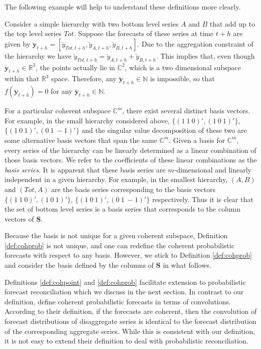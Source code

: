 \documentclass[a4paper, 11pt]{article}
\begin{document}
The following example will help to understand these definitions more clearly.

Consider a simple hierarchy with two bottom level series $A$ and $B$ that add up to the top level series $Tot$. Suppose the forecasts of these series at time $t+h$ are given by $\breve{\bm{y}}_{t+h} = [\breve{y}_{Tot,t+h},\breve{y}_{A,t+h}, \breve{y}_{B,t+h}]$. Due to the aggregation constraint of the hierarchy we have $\breve{y}_{Tot,t+h}=\breve{y}_{A,t+h}+\breve{y}_{B,t+h}$. This implies that, even though  $\breve{\bm{y}}_{t+h} \in \mathbb{R}^3$, the points actually lie in $\mathbb{C}^2$, which is a two dimensional subspace within that $\mathbb{R}^3$ space. Therefore, any $\breve{\bm{y}}_{t+h} \in \bm{\mathbb{N}}$ is impossible, so that $f(\breve{\bm{y}}_{t+h})=0$ for any $\breve{\bm{y}}_{t+h} \in \bm{\mathbb{N}}$.

For a particular coherent subspace $\mathbb{C}^m$, there exist several distinct basis vectors. For example, in the small hierarchy considered above, 
 $\{(1 ~1 ~0)', (1 ~0 ~1)'\}$, 
 $\{(1 ~ 0 ~ 1)',(0~1~-\!\!1)'\}$ 
and the singular value decomposition of these two are some alternative basis vectors that span the same $\mathbb{C}^m$. Given a basis for $\mathbb{C}^m$, every series of the hierarchy can be linearly determined as a linear combination of those basis vectors. We refer to the coefficients of these linear combinations as the \textit{basis series}. It is apparent that these basis series are $m$-dimensional and linearly independent in a given hierarchy. For example, in the smallest hierarchy, $(A,B)$ and $(Tot,A)$ are the basis series corresponding to the basis vectors 
 $\{(1 ~1 ~0)', (1 ~0 ~1)'\}$, 
 $\{(1 ~ 0 ~ 1)',(0~1~-\!\!1)'\}$
respectively. Thus it is clear that the set of bottom level series is a basis series that corresponds to the column vectors of $\bm{S}$. 

Because the basis is not unique for a given coherent subspace, Definition \ref{def:cohprob} is not unique, and one can redefine the coherent probabilistic forecasts with respect to any basis. However, we stick to Definition \ref{def:cohprob} and consider the basis defined by the columns of $\bm{S}$ in what follows.

Definitions \ref{def:cohpoint} and \ref{def:cohprob} facilitate extension to probabilistic forecast reconciliation which we discuss in the next section. In contrast to our definition, \citet{BenTaieb2017} define coherent probabilistic forecasts in terms of convolutions. According to their definition, if the forecasts are coherent, then the convolution of forecast distributions of disaggregate series is identical to the forecast distribution of the corresponding aggregate series.  While this is consistent with our definition, it is not easy to extend their definition to deal with probabilistic reconciliation.
\end{document}
